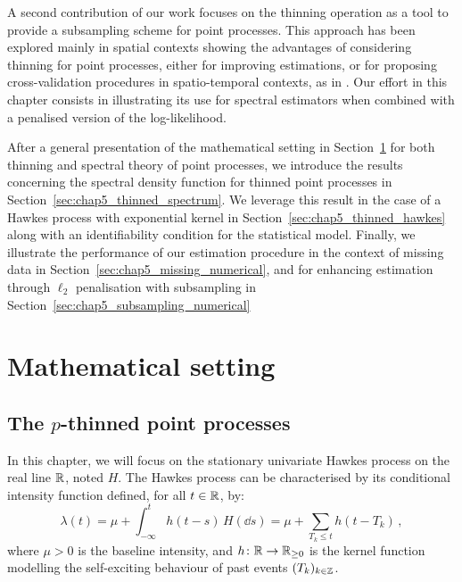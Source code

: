 A second contribution of our work focuses on the thinning operation as a tool to provide a subsampling scheme for point processes.
This approach has been explored mainly in spatial contexts \parencite{Moller2003, Moradi2019, Cronie2024} showing the advantages of considering thinning for point processes, 
either for improving estimations, or for proposing cross-validation procedures in spatio-temporal contexts, as in \textcite{Coeurjolly2024}.
Our effort in this chapter consists in illustrating its use for spectral estimators when combined with a penalised version of the log-likelihood.


After a general presentation of the mathematical setting in Section~\ref{sec:chap5_mathsetting} for both thinning and spectral theory of point processes, 
we introduce the results concerning the spectral density function for thinned point processes in Section~\ref{sec:chap5_thinned_spectrum}.
We leverage this result in the case of a Hawkes process with exponential kernel in Section~\ref{sec:chap5_thinned_hawkes} along with an identifiability condition for the statistical model.
Finally, we illustrate the performance of our estimation procedure in the context of missing data in Section~\ref{sec:chap5_missing_numerical}, and for enhancing estimation through $\ell_2$ penalisation with subsampling in Section~\ref{sec:chap5_subsampling_numerical}


\section{Mathematical setting}\label{sec:chap5_mathsetting}

\subsection{The $p$-thinned point processes}\label{sec:chap5_hawkesprocess}

In this chapter, we will focus on the stationary univariate Hawkes process on the real line ${\mathbb R}$, noted $H$.
The Hawkes process can be characterised by its conditional intensity function defined, for all $t\in{\mathbb R}$, by:
\begin{equation}\label{eq:chap5_hawkes_intensity}
    \lambda(t) = \mu + \int_{-\infty}^{t}{h(t-s)\,H(\dd s)} = \mu + \sum_{T_k \leq t}{h(t-T_k)}\,,
\end{equation}
where $\mu > 0$ is the baseline intensity, and $h\colon{\mathbb R}\to {\mathbb R}_{\geq 0}$ is the kernel function modelling the self-exciting behaviour of past events $(T_k)_{k\in{\mathbb Z}}$.

